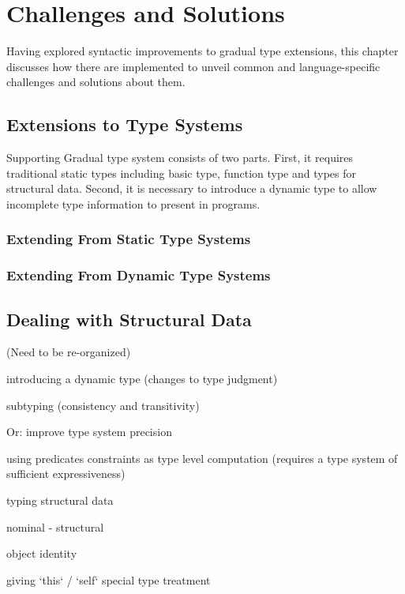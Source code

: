 
\renewcommand{\thechapter}{3}

\chapter{Challenges and Solutions}

Having explored syntactic improvements to gradual type extensions,
this chapter discusses how there are implemented to unveil common and language-specific
challenges and solutions about them.

\section{Extensions to Type Systems}

Supporting Gradual type system consists of two parts.
First, it requires traditional static types including basic type, function type and types for structural data.
Second, it is necessary to introduce a dynamic type to allow incomplete type information to present in programs.

\subsection{Extending From Static Type Systems}

\subsection{Extending From Dynamic Type Systems}

\section{Dealing with Structural Data}

(Need to be re-organized)

introducing a dynamic type (changes to type judgment)

subtyping (consistency and transitivity)

Or: improve type system precision

using predicates
constraints as type level computation (requires a type system of sufficient expressiveness)

typing structural data

nominal
- structural

object identity

giving `this` / `self` special type treatment

